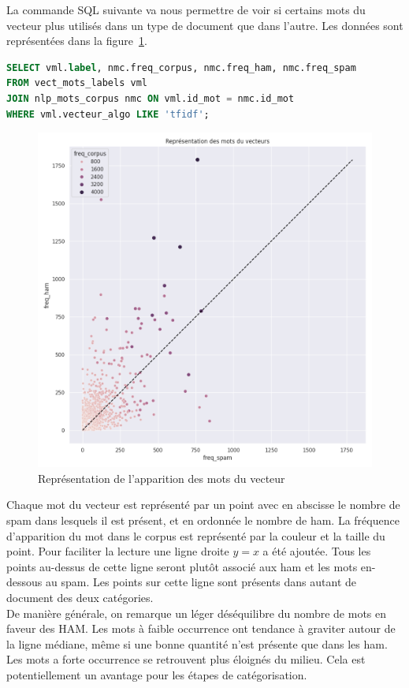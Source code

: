         La commande SQL suivante va nous permettre de voir si certains mots du vecteur plus utilisés dans un type de document que dans l'autre.
        Les données sont représentées dans la figure~\ref{fig:tfidf_mots}.
        \begin{lstlisting}[title=Commande SQL pour lister les mots du vecteur, language=SQL]
SELECT vml.label, nmc.freq_corpus, nmc.freq_ham, nmc.freq_spam
FROM vect_mots_labels vml
JOIN nlp_mots_corpus nmc ON vml.id_mot = nmc.id_mot
WHERE vml.vecteur_algo LIKE 'tfidf';
        \end{lstlisting}
        \begin{figure}[H]
            \includegraphics[width=\linewidth]{img/vectmots}
            \caption{Représentation de l'apparition des mots du vecteur}
            \label{fig:tfidf_mots}
        \end{figure}
        Chaque mot du vecteur est représenté par un point avec en abscisse le nombre de spam dans lesquels il est présent, et en ordonnée le nombre de ham.
        La fréquence d'apparition du mot dans le corpus est représenté par la couleur et la taille du point.
        Pour faciliter la lecture une ligne droite $y=x$ a été ajoutée.
        Tous les points au-dessus de cette ligne seront plutôt associé aux ham et les mots en-dessous au spam.
        Les points sur cette ligne sont présents dans autant de document des deux catégories.\\
        De manière générale, on remarque un léger déséquilibre du nombre de mots en faveur des HAM.
        Les mots à faible occurrence ont tendance à graviter autour de la ligne médiane, même si une bonne quantité n'est présente que dans les ham.
        Les mots a forte occurrence se retrouvent plus éloignés du milieu.
        Cela est potentiellement un avantage pour les étapes de catégorisation.

